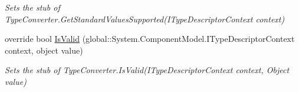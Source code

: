 \begin{DoxyCompactItemize}
\begin{DoxyCompactList}\small\item\em Sets the stub of Type\-Converter.\-Get\-Standard\-Values\-Supported(\-I\-Type\-Descriptor\-Context context)\end{DoxyCompactList}\item 
override bool \hyperlink{class_system_1_1_security_1_1_authentication_1_1_extended_protection_1_1_fakes_1_1_stub_extendedf67afed15bbc0df07bfc91316f6f81f0_a0e301e35fcba763538f59c3ea66b3a6d}{Is\-Valid} (global\-::\-System.\-Component\-Model.\-I\-Type\-Descriptor\-Context context, object value)
\begin{DoxyCompactList}\small\item\em Sets the stub of Type\-Converter.\-Is\-Valid(\-I\-Type\-Descriptor\-Context context, Object value)\end{DoxyCompactList}\end{DoxyCompactItemize}
